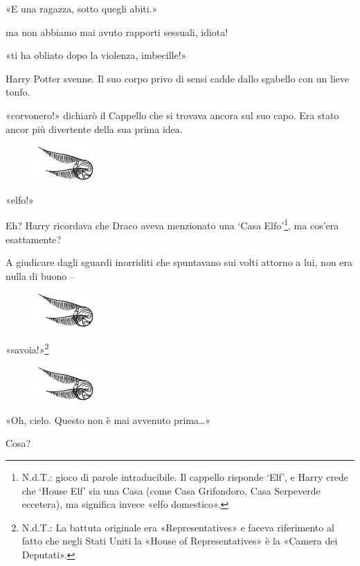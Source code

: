 «E una ragazza, sotto quegli abiti.»

ma non abbiamo mai avuto rapporti sessuali, idiota!

«ti ha obliato dopo la violenza, imbecille!»

Harry Potter svenne. Il suo corpo privo di sensi cadde dallo sgabello con un lieve tonfo.

«corvonero!» dichiarò il Cappello che si trovava ancora sul suo capo. Era stato ancor più divertente della sua prima idea.

\begin{figure}[h]
	\includegraphics[scale=0.4]{boccino.png}
	\centering
\end{figure}

«elfo!»

Eh? Harry ricordava che Draco aveva menzionato una ‘Casa Elfo’\footnote{N.d.T.: gioco di parole intraducibile. Il cappello risponde ‘Elf’, e Harry crede che ‘House Elf’ sia una Casa (come Casa Grifondoro, Casa Serpeverde eccetera), ma significa invece «elfo domestico».}, ma cos’era esattamente?

A giudicare dagli sguardi inorriditi che spuntavano sui volti attorno a lui, non era nulla di buono –

\begin{figure}[h!]
	\includegraphics[scale=0.4]{boccino.png}
	\centering
\end{figure}

«savoia!»\footnote{N.d.T.: La battuta originale era «Representatives» e faceva riferimento al fatto che negli Stati Uniti la «House of Representatives» è la «Camera dei Deputati».}

\begin{figure}[h!]
	\includegraphics[scale=0.4]{boccino.png}
	\centering
\end{figure}

«Oh, cielo. Questo non è mai avvenuto prima…»

Cosa?

